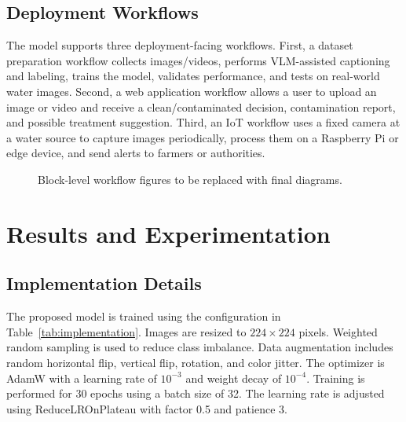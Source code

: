 \documentclass[journal]{IEEEtran}
\begin{document}
\subsection{Deployment Workflows}
\label{subsec:deployment_workflows}
The model supports three deployment-facing workflows. First, a dataset preparation workflow collects images/videos, performs VLM-assisted captioning and labeling, trains the model, validates performance, and tests on real-world water images. Second, a web application workflow allows a user to upload an image or video and receive a clean/contaminated decision, contamination report, and possible treatment suggestion. Third, an IoT workflow uses a fixed camera at a water source to capture images periodically, process them on a Raspberry Pi or edge device, and send alerts to farmers or authorities.

\begin{figure}[!t]
\centering
{}
\hfill
{}
\hfill
{}
\caption{Block-level workflow figures to be replaced with final diagrams.}
\label{fig:block_workflows}
\end{figure}

\section{Results and Experimentation}
\label{sec:experiments}

\subsection{Implementation Details}
\label{subsec:implementation_details}
The proposed model is trained using the configuration in Table~\ref{tab:implementation}. Images are resized to $224 \times 224$ pixels. Weighted random sampling is used to reduce class imbalance. Data augmentation includes random horizontal flip, vertical flip, rotation, and color jitter. The optimizer is AdamW with a learning rate of $10^{-3}$ and weight decay of $10^{-4}$. Training is performed for 30 epochs using a batch size of 32. The learning rate is adjusted using ReduceLROnPlateau with factor 0.5 and patience 3.
\end{document}

